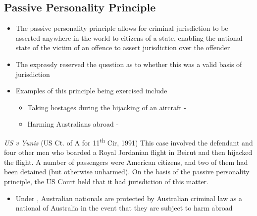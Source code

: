 \subsection{Passive Personality Principle}
\begin{itemize}
    \item The passive personality principle allows for criminal jurisdiction to be asserted anywhere in the world to citizens of a state, enabling the national state of the victim of an offence to assert jurisdiction over the offender
    \item The  expressly reserved the question as to whether this was a valid basis of jurisdiction
    \item Examples of this principle being exercised include
    \begin{itemize}
        \item Taking hostages during the hijacking of an aircraft - 
        \item Harming Australians abroad - 
    \end{itemize}
\end{itemize}

\begin{casedetails}{\textit{US v Yunis} (US Ct. of A for 11\textsuperscript{th} Cir, 1991)}
    \flushleft
    This case involved the defendant and four other men who boarded a Royal Jordanian flight in Beirut and then hijacked the flight. A number of passengers were American citizens, and two of them had been detained (but otherwise unharmed). On the basis of the passive personality principle, the US Court held that it had jurisdiction of this matter.
\end{casedetails}

\begin{itemize}
    \item Under , Australian nationals are protected by Australian criminal law as a national of Australia in the event that they are subject to harm abroad
\end{itemize}

